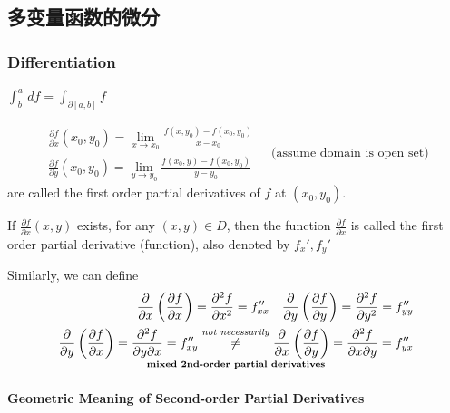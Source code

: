 \subsection{多变量函数的微分}
\subsubsection[多变量函数的偏微商]{Differentiation}

$\int^a_b\,df=\int_{\partial[a,b]}f$

$$\begin{aligned}
        \frac{\partial f}{\partial x}\left(x_0,y_0\right)=\lim_{x\to x_0}\frac{f\left(x,y_0\right)-f\left(x_0,y_0\right)}{x-x_0} \\
        \frac{\partial f}{\partial y}\left(x_0,y_0\right)=\lim_{y\to y_0}\frac{f\left(x_0,y\right)-f\left(x_0,y_0\right)}{y-y_0}
    \end{aligned}\quad\text{(assume domain is open set)}$$are called the first order partial derivatives of $f$ at $(x_0,y_0)$.

If $\frac{\partial f}{\partial x}(x,y)$ exists, for any $(x,y)\in D$, then the function $\frac{\partial f}{\partial x}$ is called the first order partial derivative (function), also denoted by $f_x',f_y'$

Similarly, we can define
\begin{align*}
    \frac{\partial}{\partial x}\left(\frac{\partial f}{\partial x}\right)=\frac{\partial^2f}{\partial x^2}=f_{xx}''\quad\frac{\partial}{\partial y}\left(\frac{\partial f}{\partial y}\right)=\frac{\partial^2f}{\partial y^2}=f_{yy}'' \\
    \underset{\text{ \textbf{\boldmath mixed 2nd-order partial derivatives} }}{\frac{\partial}{\partial y}\left(\frac{\partial f}{\partial x}\right)=\frac{\partial^2f}{\partial y\partial x}=f_{xy}''\overset{\text{\emph{not necessarily}}}{\neq}\frac{\partial}{\partial x}\left(\frac{\partial f}{\partial y}\right)=\frac{\partial^2f}{\partial x\partial y}=f_{yx}''}
\end{align*}

\paragraph{Geometric Meaning of Second-order Partial Derivatives}


